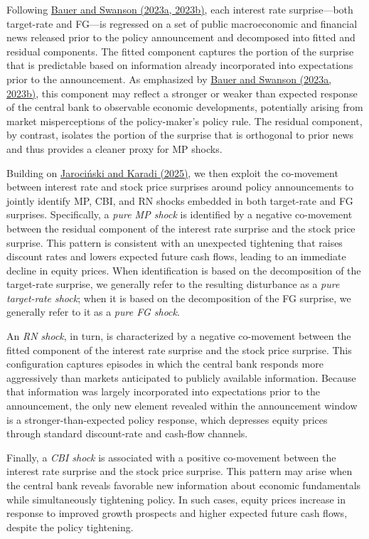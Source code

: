 \documentclass[12pt, reqno]{article}
\begin{document}
Following \hyperlink{Bauer and Swanson (2023a, 2023b)}{Bauer and Swanson (2023a, 2023b)}, each interest rate surprise—both target-rate and FG—is regressed on a set of public macroeconomic and financial news released prior to the policy announcement and decomposed into fitted and residual components. The fitted component captures the portion of the surprise that is predictable based on information already incorporated into expectations prior to the announcement. As emphasized by \hyperlink{Bauer and Swanson (2023a, 2023b)}{Bauer and Swanson (2023a, 2023b)}, this component may reflect a stronger or weaker than expected response of the central bank to observable economic developments, potentially arising from market misperceptions of the policy-maker's policy rule. The residual component, by contrast, isolates the portion of the surprise that is orthogonal to prior news and thus provides a cleaner proxy for MP shocks.

Building on \hyperlink{Jarociński and Karadi (2025)}{Jarociński and Karadi (2025)}, we then exploit the co-movement between interest rate and stock price surprises around policy announcements to jointly identify MP, CBI, and RN shocks embedded in both target-rate and FG surprises. Specifically, a \emph{pure MP shock} is identified by a negative co-movement between the residual component of the interest rate surprise and the stock price surprise. This pattern is consistent with an unexpected tightening that raises discount rates and lowers expected future cash flows, leading to an immediate decline in equity prices. When identification is based on the decomposition of the target-rate surprise, we generally refer to the resulting disturbance as a \emph{pure target-rate shock}; when it is based on the decomposition of the FG surprise, we generally refer to it as a \emph{pure FG shock}.

An \emph{RN shock}, in turn, is characterized by a negative co-movement between the fitted component of the interest rate surprise and the stock price surprise. This configuration captures episodes in which the central bank responds more aggressively than markets anticipated to publicly available information. Because that information was largely incorporated into expectations prior to the announcement, the only new element revealed within the announcement window is a stronger-than-expected policy response, which depresses equity prices through standard discount-rate and cash-flow channels.

Finally, a \emph{CBI shock} is associated with a positive co-movement between the interest rate surprise and the stock price surprise. This pattern may arise when the central bank reveals favorable new information about economic fundamentals while simultaneously tightening policy. In such cases, equity prices increase in response to improved growth prospects and higher expected future cash flows, despite the policy tightening.
\end{document}
